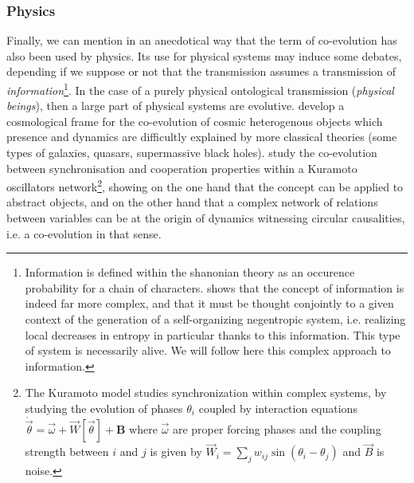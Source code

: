 \documentclass[letterpaper]{article}
\begin{document}


\subsubsection{Physics}

Finally, we can mention in an anecdotical way that the term of co-evolution has also been used by physics. Its use for physical systems may induce some debates, depending if we suppose or not that the transmission assumes a transmission of \emph{information}\footnote{Information is defined within the shanonian theory as an occurence probability for a chain of characters. \cite{morin1976methode} shows that the concept of information is indeed far more complex, and that it must be thought conjointly to a given context of the generation of a self-organizing negentropic system, i.e. realizing local decreases in entropy in particular thanks to this information. This type of system is necessarily alive. We will follow here this complex approach to information.}. In the case of a purely physical ontological transmission (\emph{physical beings}), then a large part of physical systems are evolutive. \cite{hopkins2008cosmological} develop a cosmological frame for the co-evolution of cosmic heterogenous objects which presence and dynamics are difficultly explained by more classical theories (some types of galaxies, quasars, supermassive black holes). \cite{antonioni2017coevolution} study the co-evolution between synchronisation and cooperation properties within a Kuramoto oscillators network\footnote{The Kuramoto model studies synchronization within complex systems, by studying the evolution of phases $\theta_i$ coupled by interaction equations $\dot{\vec{\theta}} = \vec{\omega} + \vec{W}\left[\vec{\theta}\right] + \mathbf{B}$ where $\vec{\omega}$ are proper forcing phases and the coupling strength between $i$ and $j$ is given by $\vec{W}_{i} = \sum_j w_{ij} \sin\left(\theta_i - \theta_j\right)$ and $\vec{B}$ is noise.}, showing on the one hand that the concept can be applied to abstract objects, and on the other hand that a complex network of relations between variables can be at the origin of dynamics witnessing circular causalities, i.e. a co-evolution in that sense.
\end{document}

